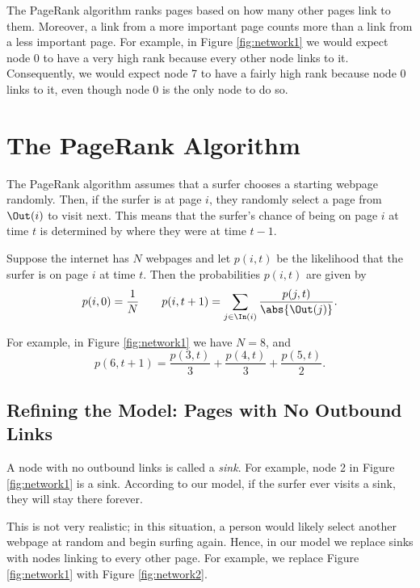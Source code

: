 The PageRank algorithm ranks pages based on how many other pages link to them.
Moreover, a link from a more important page counts more than a link from a less important page.
For example, in Figure \ref{fig:network1} we would expect node 0 to have a very high rank because every other node links to it. 
Consequently, we would expect node 7 to have a fairly high rank because node 0 links to it, even though node 0 is the only node to do so.

\section*{The PageRank Algorithm}
The PageRank algorithm assumes that a surfer chooses a starting webpage randomly.
Then, if the surfer is at page $i$, they randomly select a page from $\Out(i)$ to visit next.
This means that the surfer's chance of being on page $i$ at time $t$ is determined by where they were at time $t-1$.

Suppose the internet has $N$ webpages and let $p(i,t)$ be the likelihood that the surfer is on page $i$ at time $t$.
Then the probabilities $p(i,t)$ are given by
\begin{equation}\label{equ:pr1}
p(i,0)=\frac{1}{N} \qquad p(i,t+1) = \sum_{j \in \In(i)} \frac{p(j,t)}{\abs{\Out(j)}}.
\end{equation}

For example, in Figure \ref{fig:network1} we have $N=8$, and 
\[
p(6, t+1)=\frac{p(3,t)}{3}+\frac{p(4,t)}{3} + \frac{p(5,t)}{2}.
\]

\subsection*{Refining the Model: Pages with No Outbound Links}
A node with no outbound links is called a \emph{sink}. 
For example, node 2 in Figure \ref{fig:network1} is a sink.
According to our model, if the surfer ever visits a sink, they will stay there forever.

This is not very realistic; in this situation, a person would likely select another webpage at random and begin surfing again.
Hence, in our model we replace sinks with nodes linking to every other page. 
For example, we replace Figure \ref{fig:network1} with Figure \ref{fig:network2}.

